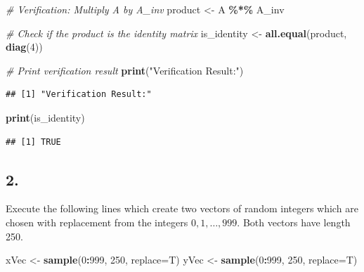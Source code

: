 \documentclass[
]{article}
\newenvironment{Shaded}{\begin{snugshade}}{\end{snugshade}}
\newcommand{\AttributeTok}[1]{\textcolor[rgb]{0.13,0.29,0.53}{#1}}
\newcommand{\CommentTok}[1]{\textcolor[rgb]{0.56,0.35,0.01}{\textit{#1}}}
\newcommand{\DecValTok}[1]{\textcolor[rgb]{0.00,0.00,0.81}{#1}}
\newcommand{\FunctionTok}[1]{\textcolor[rgb]{0.13,0.29,0.53}{\textbf{#1}}}
\newcommand{\NormalTok}[1]{#1}
\newcommand{\OtherTok}[1]{\textcolor[rgb]{0.56,0.35,0.01}{#1}}
\newcommand{\SpecialCharTok}[1]{\textcolor[rgb]{0.81,0.36,0.00}{\textbf{#1}}}
\newcommand{\StringTok}[1]{\textcolor[rgb]{0.31,0.60,0.02}{#1}}
\begin{document}
\begin{Shaded}
\begin{Highlighting}[]
\CommentTok{\# Verification: Multiply A by A\_inv}
\NormalTok{product }\OtherTok{\textless{}{-}}\NormalTok{ A }\SpecialCharTok{\%*\%}\NormalTok{ A\_inv}

\CommentTok{\# Check if the product is the identity matrix}
\NormalTok{is\_identity }\OtherTok{\textless{}{-}} \FunctionTok{all.equal}\NormalTok{(product, }\FunctionTok{diag}\NormalTok{(}\DecValTok{4}\NormalTok{))}

\CommentTok{\# Print verification result}
\FunctionTok{print}\NormalTok{(}\StringTok{"Verification Result:"}\NormalTok{)}
\end{Highlighting}
\end{Shaded}

\begin{verbatim}
## [1] "Verification Result:"
\end{verbatim}

\begin{Shaded}
\begin{Highlighting}[]
\FunctionTok{print}\NormalTok{(is\_identity)}
\end{Highlighting}
\end{Shaded}

\begin{verbatim}
## [1] TRUE
\end{verbatim}

\subsection{2.}\label{section-1}

Execute the following lines which create two vectors of random integers
which are chosen with replacement from the integers
\(0, 1, \dots , 999\). Both vectors have length 250.

\begin{Shaded}
\begin{Highlighting}[]
\NormalTok{xVec }\OtherTok{\textless{}{-}} \FunctionTok{sample}\NormalTok{(}\DecValTok{0}\SpecialCharTok{:}\DecValTok{999}\NormalTok{, }\DecValTok{250}\NormalTok{, }\AttributeTok{replace=}\NormalTok{T)}
\NormalTok{yVec }\OtherTok{\textless{}{-}} \FunctionTok{sample}\NormalTok{(}\DecValTok{0}\SpecialCharTok{:}\DecValTok{999}\NormalTok{, }\DecValTok{250}\NormalTok{, }\AttributeTok{replace=}\NormalTok{T)}
\end{Highlighting}
\end{Shaded}
\end{document}
